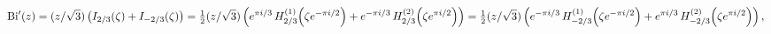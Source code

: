 \[\mathop{\mathrm{Bi}\/}\nolimits'\!\left(z\right)=(z/\sqrt{3})\left(\mathop{I_{%
2/3}\/}\nolimits\!\left(\zeta\right)+\mathop{I_{-2/3}\/}\nolimits\!\left(\zeta%
\right)\right)=\tfrac{1}{2}(z/\sqrt{3})\left(e^{\pi i/3}\mathop{{H^{(1)}_{2/3}%
}\/}\nolimits\!\left(\zeta e^{-\pi i/2}\right)+e^{-\pi i/3}\mathop{{H^{(2)}_{2%
/3}}\/}\nolimits\!\left(\zeta e^{\pi i/2}\right)\right)=\tfrac{1}{2}(z/\sqrt{3%
})\left(e^{-\pi i/3}\mathop{{H^{(1)}_{-2/3}}\/}\nolimits\!\left(\zeta e^{-\pi i%
/2}\right)+e^{\pi i/3}\mathop{{H^{(2)}_{-2/3}}\/}\nolimits\!\left(\zeta e^{\pi
i%
/2}\right)\right),\]